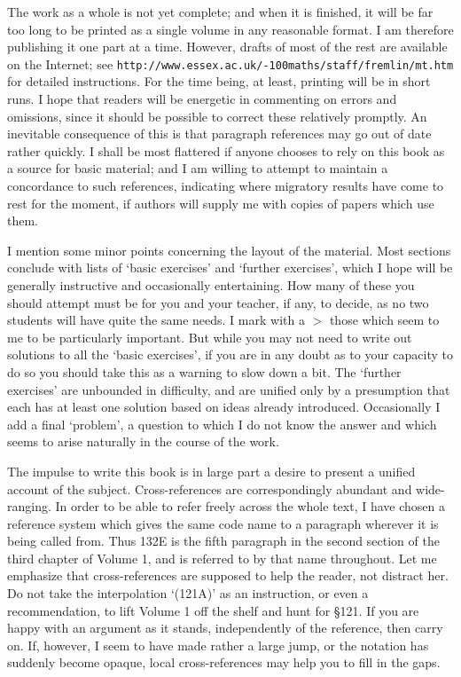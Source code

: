 The work as a whole is not yet complete;  and when it is finished, it
will be far too long to be printed as a single volume in any
reasonable format.   I am therefore publishing it one part at a time.
However, drafts of most of the rest are available on the Internet;  see
{\tt http://www.essex.ac.uk/\penalty-100maths/staff/fremlin/mt.htm} for detailed instructions.   For the time being, at
least, printing will be in short runs.   I hope that readers will be
energetic in commenting on errors and omissions, since it should be
possible to correct these relatively promptly.   An inevitable
consequence of this is that paragraph references may go out of date
rather quickly.   I shall be most flattered if anyone chooses to rely on
this book as a source for basic material;  and I am willing to attempt
to maintain a concordance to such references, indicating where migratory
results have come to rest for the moment, if authors will supply me with
copies of papers which use them.

I mention some minor points concerning the layout of the material.
Most sections conclude with lists of `basic exercises' and
`further exercises', which I hope will be generally instructive and
occasionally entertaining.   How many of these you should attempt must
be for you and your teacher, if any, to decide, as no two students will
have quite the same needs.   I mark with a $\pmb{>}$ those which seem to
me to be particularly important.   But while you may not need to write
out solutions to all the `basic exercises', if you are in any doubt
as to your capacity to do so you should take this as a warning to slow
down a bit.   The `further exercises' are unbounded in difficulty,
and are unified only by a presumption that each has at least one
solution based
on ideas already introduced.   Occasionally I add a final `problem',
a question to which I do not know the answer and which seems to arise
naturally in the course of the work.

The impulse to write this book is in large part a desire to present a
unified account of the subject.   Cross-references are correspondingly
abundant and wide-ranging.  In order to be able to refer freely across
the whole
text, I have chosen a reference system which gives the same code name to
a paragraph wherever it is being called from.   Thus 132E is the fifth
paragraph in the second section of the
third chapter of Volume 1, and is referred to by that name throughout.
Let me emphasize that cross-references are supposed to help the reader,
not distract her.   Do not take the interpolation `(121A)' as an
instruction, or even a recommendation, to lift Volume 1 off the shelf
and hunt for \S121.   If you are happy with an argument as it stands,
independently of the reference, then carry on.   If, however, I seem to
have made rather a large jump, or the notation has suddenly become
opaque, local cross-references may help you to fill in the gaps.

